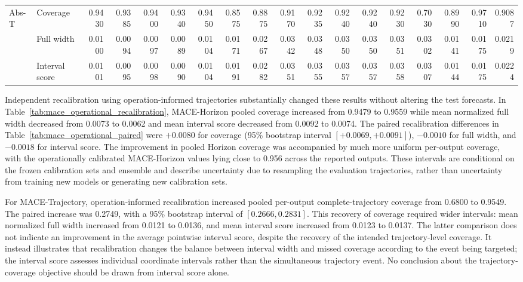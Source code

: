 \begin{table}[!htbp]
{\begin{tabular}{@{}ll*{16}{r}@{}}
\midrule
\multirow{3}{*}{Abs-T}
& Coverage
& 0.9430 & 0.9385 & 0.9400 & 0.9340 & 0.9450
& 0.8575 & 0.8875 & 0.9170 & 0.9235 & 0.9240 & 0.9240
& 0.9230 & 0.7030 & 0.8990 & 0.9710 & 0.9087 \\
& Full width
& 0.0100 & 0.0094 & 0.0097 & 0.0089 & 0.0104
& 0.0171 & 0.0267 & 0.0342 & 0.0348 & 0.0350 & 0.0350
& 0.0351 & 0.0302 & 0.0141 & 0.0175 & 0.0219 \\
& Interval score
& 0.0101 & 0.0095 & 0.0098 & 0.0090 & 0.0104
& 0.0191 & 0.0282 & 0.0351 & 0.0355 & 0.0357 & 0.0357
& 0.0358 & 0.0307 & 0.0144 & 0.0175 & 0.0224 \\
\bottomrule
\end{tabular}%
}
\end{table}

Independent recalibration using operation-informed trajectories substantially changed these results without altering the test forecasts. In Table~\ref{tab:mace_operational_recalibration}, MACE-Horizon pooled coverage increased from 0.9479 to 0.9559 while mean normalized full width decreased from 0.0073 to 0.0062 and mean interval score decreased from 0.0092 to 0.0074. The paired recalibration differences in Table~\ref{tab:mace_operational_paired} were $+0.0080$ for coverage (95\% bootstrap interval $[+0.0069,+0.0091]$), $-0.0010$ for full width, and $-0.0018$ for interval score. The improvement in pooled Horizon coverage was accompanied by much more uniform per-output coverage, with the operationally calibrated MACE-Horizon values lying close to 0.956 across the reported outputs. These intervals are conditional on the frozen calibration sets and ensemble and describe uncertainty due to resampling the evaluation trajectories, rather than uncertainty from training new models or generating new calibration sets.

For MACE-Trajectory, operation-informed recalibration increased pooled per-output complete-trajectory coverage from 0.6800 to 0.9549. The paired increase was 0.2749, with a 95\% bootstrap interval of $[0.2666,0.2831]$. This recovery of coverage required wider intervals: mean normalized full width increased from 0.0121 to 0.0136, and mean interval score increased from 0.0123 to 0.0137. The latter comparison does not indicate an improvement in the average pointwise interval score, despite the recovery of the intended trajectory-level coverage. It instead illustrates that recalibration changes the balance between interval width and missed coverage according to the event being targeted; the interval score assesses individual coordinate intervals rather than the simultaneous trajectory event. No conclusion about the trajectory-coverage objective should be drawn from interval score alone.

